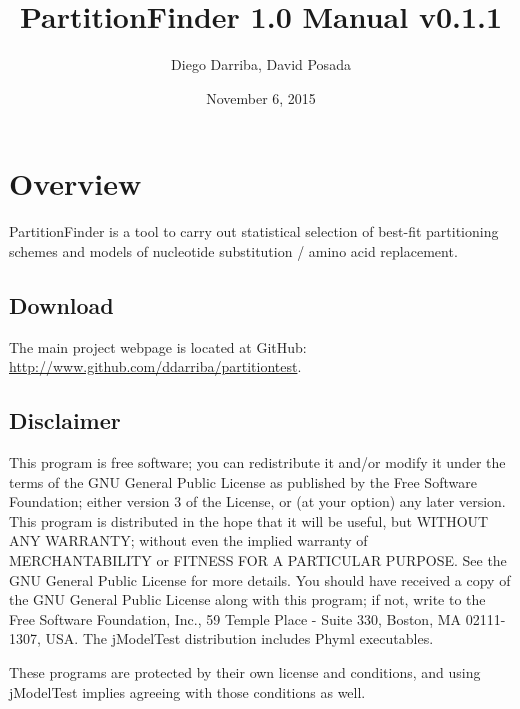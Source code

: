 \documentclass[11pt,twoside,a4paper]{article}
\begin{document}
\providecommand{\versionnumber}{0.1.1}
\title{PartitionFinder 1.0 Manual v\versionnumber}
\author{Diego Darriba, David Posada}
\date{November 6, 2015}
\maketitle

\setcounter{tocdepth}{2}
\tableofcontents

\section{Overview}

PartitionFinder is a tool to carry out statistical selection of best-fit partitioning schemes and models of nucleotide substitution / amino acid replacement.

\subsection{Download}

The main project webpage is located at GitHub: \url{http://www.github.com/ddarriba/partitiontest}.



\subsection{Disclaimer}

This program is free software; you can redistribute it and/or modify it under the terms of the GNU General Public License as published by the Free Software Foundation; either version 3 of the License, or (at your option) any later version. This program is distributed in the hope that it will be useful, but WITHOUT ANY WARRANTY; without even the implied warranty of MERCHANTABILITY or FITNESS FOR A PARTICULAR PURPOSE. See the GNU General Public License for more details. You should have received a copy of the GNU General Public License along with this program; if not, write to the Free Software Foundation, Inc., 59 Temple Place - Suite 330, Boston, MA 02111-1307, USA. The jModelTest distribution includes Phyml executables.

These programs are protected by their own license and conditions, and using jModelTest implies agreeing with those conditions as well. 
\end{document}
